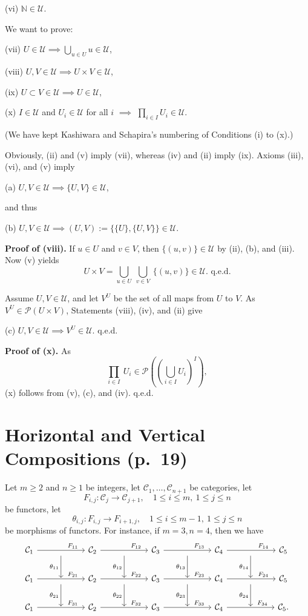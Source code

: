 \documentclass[12pt]{article}
\theoremstyle{remark}
\theoremstyle{definition}
\newcommand{\C}{\mathcal C}
\begin{document}
(vi) $\mathbb N\in\mathcal U$.

\noindent We want to prove:

(vii) $U\in\mathcal U\implies\bigcup_{u\in U}u\in\mathcal U$,

(viii) $U,V\in\mathcal U\implies U\times V\in\mathcal U$,

(ix) $U\subset V\in\mathcal U\implies U\in\mathcal U$,

(x) $I\in \mathcal U$ and $U_i\in\mathcal U$ for all $i$ $\implies$ $\prod_{i\in I}U_i\in\mathcal U$.

\noindent(We have kept Kashiwara and Schapira's numbering of Conditions (i) to (x).) 

\noindent Obviously, (ii) and (v) imply (vii), whereas (iv) and (ii) imply (ix). Axioms (iii), (vi), and (v) imply

(a) $U,V\in\mathcal U\implies\{U,V\}\in\mathcal U$,

\noindent and thus

(b) $U,V\in\mathcal U\implies(U,V):=\{\{U\},\{U,V\}\}\in\mathcal U$.

\noindent\textbf{Proof of (viii).} If $u\in U$ and $v\in V$, then $\{(u,v)\}\in\mathcal U$ by (ii), (b), and (iii). Now (v) yields 
$$
U\times V=\bigcup_{u\in U}\ \bigcup_{v\in V}\ \{(u,v)\}\in\mathcal U.\text{ q.e.d.} 
$$ 

Assume $U,V\in\mathcal U$, and let $V^U$ be the set of all maps from $U$ to $V$. As $V^U\in\mathcal P(U\times V)$, Statements (viii), (iv), and (ii) give

(c) $U,V\in\mathcal U\implies V^U\in\mathcal U$. q.e.d.

\noindent\textbf{Proof of (x).} As 
$$
\prod_{i\in I}\ U_i\in\mathcal P\left(\left(\bigcup_{i\in I}U_i\right)^I\right),
$$
(x) follows from (v), (c), and (iv). q.e.d.
%
\section{Horizontal and Vertical Compositions (p.~19)} %
%
Let $m\ge2$ and $n\ge1$ be integers, let $\C_1,\dots,\C_{n+1}$ be categories, let 
$$
F_{i,j}:\C_j\to\C_{j+1},\quad1\le i\le m,\ 1\le j\le n
$$
be functors, let 
$$
\theta_{i,j}:F_{i,j}\to F_{i+1,j},\quad1\le i\le m-1,\ 1\le j\le n
$$
be morphisms of functors. For instance, if $m=3,n=4$, then we have 
$$
\begin{tikzcd}
%
\C_1\ar{rr}{}[near end]{F_{11}}&\ar{d}[swap]{\theta_{11}}&\C_2\ar{rr}{}[near end]{F_{12}}&\ar{d}[swap]{\theta_{12}}&\C_3\ar{rr}{}[near end]{F_{13}}&\ar{d}[swap]{\theta_{13}}&\C_4\ar{rr}{}[near end]{F_{14}}&\ar{d}[swap]{\theta_{14}}&\C_5\\ 
%
\C_1\ar{rr}{}[near end]{F_{21}}&{}\ar{d}[swap]{\theta_{21}}&\C_2\ar{rr}{}[near end]{F_{22}}&{}\ar{d}[swap]{\theta_{22}}&\C_3\ar{rr}{}[near end]{F_{23}}&{}\ar{d}[swap]{\theta_{23}}&\C_4\ar{rr}{}[near end]{F_{24}}&{}\ar{d}[swap]{\theta_{24}}&\C_5\\ 
%
\C_1\ar{rr}{}[near end]{F_{31}}&{}&\C_2\ar{rr}{}[near end]{F_{32}}&{}&\C_3\ar{rr}{}[near end]{F_{33}}&{}&\C_4\ar{rr}{}[near end]{F_{34}}&{}&\C_5.
\end{tikzcd}
$$ 
\end{document}
